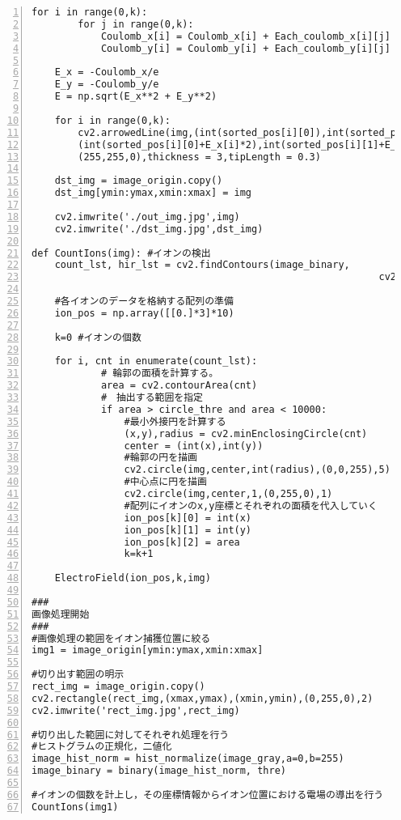 \documentclass[a4paper,11pt,titlepage,openany]{jsbook}
\begin{document}
\begin{Verbatim}[numbers = left,frame=single]
    for i in range(0,k):
        for j in range(0,k):
            Coulomb_x[i] = Coulomb_x[i] + Each_coulomb_x[i][j]
            Coulomb_y[i] = Coulomb_y[i] + Each_coulomb_y[i][j]
    
    E_x = -Coulomb_x/e
    E_y = -Coulomb_y/e
    E = np.sqrt(E_x**2 + E_y**2)
    
    for i in range(0,k):
        cv2.arrowedLine(img,(int(sorted_pos[i][0]),int(sorted_pos[i][1])),
        (int(sorted_pos[i][0]+E_x[i]*2),int(sorted_pos[i][1]+E_y[i]*2)),
        (255,255,0),thickness = 3,tipLength = 0.3)
    
    dst_img = image_origin.copy()
    dst_img[ymin:ymax,xmin:xmax] = img
    
    cv2.imwrite('./out_img.jpg',img)
    cv2.imwrite('./dst_img.jpg',dst_img)

def CountIons(img): #イオンの検出
    count_lst, hir_lst = cv2.findContours(image_binary, 
    														cv2.RETR_TREE, cv2.CHAIN_APPROX_SIMPLE)

    #各イオンのデータを格納する配列の準備  
    ion_pos = np.array([[0.]*3]*10)
    
    k=0 #イオンの個数
    
    for i, cnt in enumerate(count_lst):
            # 輪郭の面積を計算する。
            area = cv2.contourArea(cnt)
            #　抽出する範囲を指定
            if area > circle_thre and area < 10000:
                #最小外接円を計算する
                (x,y),radius = cv2.minEnclosingCircle(cnt)
                center = (int(x),int(y))
                #輪郭の円を描画
                cv2.circle(img,center,int(radius),(0,0,255),5)
                #中心点に円を描画
                cv2.circle(img,center,1,(0,255,0),1)
                #配列にイオンのx,y座標とそれぞれの面積を代入していく
                ion_pos[k][0] = int(x)
                ion_pos[k][1] = int(y)
                ion_pos[k][2] = area            
                k=k+1

    ElectroField(ion_pos,k,img)

###    
画像処理開始
###
#画像処理の範囲をイオン捕獲位置に絞る
img1 = image_origin[ymin:ymax,xmin:xmax]

#切り出す範囲の明示
rect_img = image_origin.copy()
cv2.rectangle(rect_img,(xmax,ymax),(xmin,ymin),(0,255,0),2)
cv2.imwrite('rect_img.jpg',rect_img)

#切り出した範囲に対してそれぞれ処理を行う
#ヒストグラムの正規化，二値化
image_hist_norm = hist_normalize(image_gray,a=0,b=255)
image_binary = binary(image_hist_norm, thre)

#イオンの個数を計上し，その座標情報からイオン位置における電場の導出を行う
CountIons(img1)
\end{Verbatim}

\backmatter
	

	
	
\end{document}
